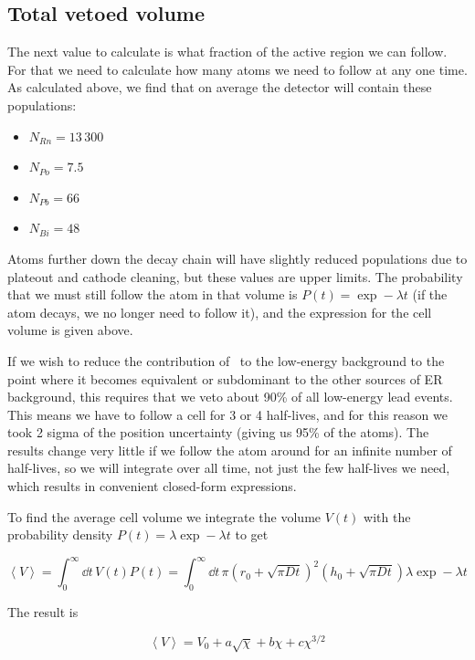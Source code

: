 \subsection{Total vetoed volume}

The next value to calculate is what fraction of the active region we can follow. For that we need to calculate how many atoms we need to follow at any one time. As calculated above, we find that on average the detector will contain these populations:
\begin{itemize}
    \item $N_{Rn} = 13\,300$
    \item $N_{Po} = 7.5$
    \item $N_{Pb} = 66$
    \item $N_{Bi} = 48$
\end{itemize}

Atoms further down the decay chain will have slightly reduced populations due to plateout and cathode cleaning, but these values are upper limits. The probability that we must still follow the atom in that volume is $P(t) = \exp -\lambda t$ (if the atom decays, we no longer need to follow it), and the expression for the cell volume is given above.

If we wish to reduce the contribution of \Pb~to the low-energy background to the point where it becomes equivalent or subdominant to the other sources of ER background, this requires that we veto about 90\% of all low-energy lead events. This means we have to follow a cell for 3 or 4 half-lives, and for this reason we took 2 sigma of the position uncertainty (giving us 95\% of the atoms). The results change very little if we follow the atom around for an infinite number of half-lives, so we will integrate over all time, not just the few half-lives we need, which results in convenient closed-form expressions.

To find the average cell volume we integrate the volume $V(t)$ with the probability density $P(t) = \lambda \exp -\lambda t$ to get

\begin{equation}
\left< V \right> = \int_0^{\infty} \dd t\,V(t) P(t) = \int_0^{\infty} \dd t\,\pi(r_0 + \sqrt{\pi Dt})^2(h_0 + \sqrt{\pi Dt})\lambda\exp -\lambda t
\end{equation}

The result is

\begin{equation}
\left< V \right> = V_0 + a\sqrt{\chi} + b\chi + c\chi^{3/2}
\end{equation}


